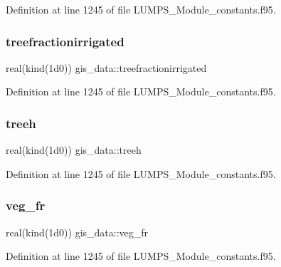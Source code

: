 Definition at line 1245 of file L\+U\+M\+P\+S\+\_\+\+Module\+\_\+constants.\+f95.

\mbox{\label{namespacegis__data_adf2d66b8c91265b1373f86153ba0a07c}} 
\subsubsection{\texorpdfstring{treefractionirrigated}{treefractionirrigated}}
{\footnotesize\ttfamily real(kind(1d0)) gis\+\_\+data\+::treefractionirrigated}



Definition at line 1245 of file L\+U\+M\+P\+S\+\_\+\+Module\+\_\+constants.\+f95.

\mbox{\label{namespacegis__data_a61372aae8e3ed0ee5389693466534169}} 
\subsubsection{\texorpdfstring{treeh}{treeh}}
{\footnotesize\ttfamily real(kind(1d0)) gis\+\_\+data\+::treeh}



Definition at line 1245 of file L\+U\+M\+P\+S\+\_\+\+Module\+\_\+constants.\+f95.

\mbox{\label{namespacegis__data_a16985ccbad5040769f8cd039103c4f15}} 
\subsubsection{\texorpdfstring{veg\+\_\+fr}{veg\_fr}}
{\footnotesize\ttfamily real(kind(1d0)) gis\+\_\+data\+::veg\+\_\+fr}



Definition at line 1245 of file L\+U\+M\+P\+S\+\_\+\+Module\+\_\+constants.\+f95.

\mbox{\label{namespacegis__data_a9cc38462906e83260e293f5b447c4374}} 

